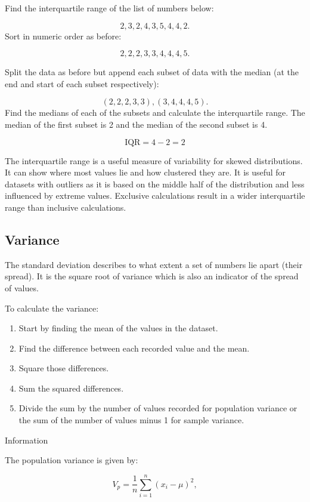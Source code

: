 \documentclass[
]{book}
\providecommand{\tightlist}{%
  \setlength{\itemsep}{0pt}\setlength{\parskip}{0pt}}
\begin{document}
Find the interquartile range of the list of numbers below:

\[ 2, 3, 2, 4, 3, 5, 4, 4, 2.\]
Sort in numeric order as before:

\[2, 2, 2, 3, 3, 4, 4, 4, 5.\]

Split the data as before but append each subset of data with the median (at the end and start of each subset respectively):

\[(2, 2, 2, 3, 3),(3, 4, 4, 4, 5).\]
Find the medians of each of the subsets and calculate the interquartile range. The median of the first subset is 2 and the median of the second subset is 4.

\[ \textrm{IQR} = 4 - 2 = 2 \]

The interquartile range is a useful measure of variability for skewed distributions. It can show where most values lie and how clustered they are. It is useful for datasets with outliers as it is based on the middle half of the distribution and less influenced by extreme values. Exclusive calculations result in a wider interquartile range than inclusive calculations.

\hypertarget{varr}{%
\subsection{Variance}\label{varr}}

The standard deviation describes to what extent a set of numbers lie apart (their spread). It is the square root of variance which is also an indicator of the spread of values.

To calculate the variance:

\begin{enumerate}
\def\labelenumi{\arabic{enumi}.}
\tightlist
\item
  Start by finding the mean of the values in the dataset.
\item
  Find the difference between each recorded value and the mean.
\item
  Square those differences.
\item
  Sum the squared differences.
\item
  Divide the sum by the number of values recorded for population variance or the sum of the number of values minus 1 for sample variance.
\end{enumerate}

Information

The population variance is given by:

\[V_{p} = \frac{1}{n}\sum_{i=1}^n (x_i - \mu)^2,\]
\end{document}
